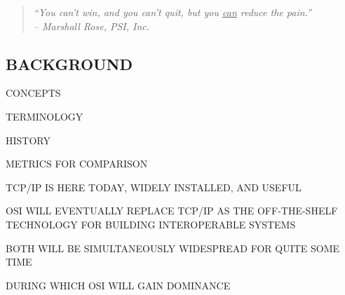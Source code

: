\begin{bwslide}

\begin{quote}\em
``You can't win, and you can't quit, but you \underline{can} reduce the
pain.''\\ \raggedleft
-- Marshall Rose, PSI, Inc.
\end{quote}
\end{bwslide}


\begin{bwslide}
\part	{BACKGROUND}\bf

\begin{nrtc}
\item	CONCEPTS

\item	TERMINOLOGY

\item	HISTORY

\item	METRICS FOR COMPARISON
\end{nrtc}
\end{bwslide}


\begin{bwslide}

\begin{nrtc}
\item	TCP/IP IS HERE TODAY, WIDELY INSTALLED, AND USEFUL

\item	OSI WILL EVENTUALLY REPLACE TCP/IP AS THE OFF-THE-SHELF TECHNOLOGY FOR
	BUILDING INTEROPERABLE SYSTEMS

\item	BOTH WILL BE SIMULTANEOUSLY WIDESPREAD FOR QUITE SOME TIME
    \begin{nrtc}
    \item	DURING WHICH OSI WILL GAIN DOMINANCE
    \end{nrtc}
\end{nrtc}
\end{bwslide}


